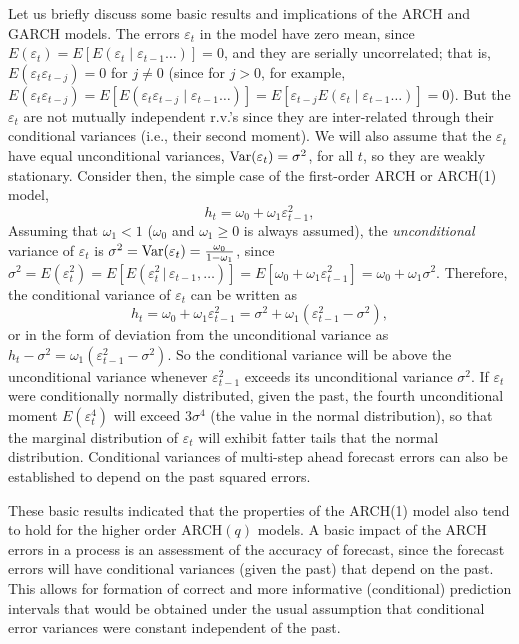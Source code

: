Let us briefly discuss some basic results and implications of the ARCH and GARCH models. The errors $\varepsilon_t$ in the model have zero mean, since $E(\varepsilon_t) = E[E(\varepsilon_t \;|\; \varepsilon_{t-1} \ldots)] = 0$, and they are serially uncorrelated; that is, $E(\varepsilon_t \varepsilon_{t-j}) = 0$ for $j \not= 0$ (since for $j > 0$, for example, $E(\varepsilon_t \varepsilon_{t-j}) = E[E(\varepsilon_t \varepsilon_{t-j} \;|\; \varepsilon_{t-1} \ldots)] = E[\varepsilon_{t-j} E(\varepsilon_t \;|\; \varepsilon_{t-1} \ldots)] = 0$). But the $\varepsilon_t$ are not mutually independent r.v.'s since they are inter-related through their conditional variances (i.e., their second moment). We will also assume that the $\varepsilon_t$ have equal unconditional variances, $\operatorname{Var}(\varepsilon_t) = \sigma^2$, for all $t$, so they are weakly stationary. Consider then, the simple case of the first-order ARCH or ARCH(1) model,
	\begin{equation} \label{eqn:2htE}
	h_t = \omega_0 + \omega_1 \varepsilon_{t-1}^2,
	\end{equation}
Assuming that $\omega_1 < 1$ ($\omega_0$ and $\omega_1 \geq 0$ is always assumed), the \emph{unconditional} variance of $\varepsilon_t$ is $\sigma^2= \operatorname{Var}(\varepsilon_t) = \frac{\omega_0}{1 - \omega_1}$, since $\sigma^2 = E(\varepsilon_t^2) = E[E(\varepsilon_t^2 \,|\, \varepsilon_{t-1}, \ldots)] = E[\omega_0 + \omega_1\varepsilon_{t-1}^2] = \omega_0 + \omega_1\sigma^2$. Therefore, the conditional variance of $\varepsilon_t$ can be written as
	\begin{equation} \label{eqn:2htw}
	h_t = \omega_0 + \omega_1 \varepsilon_{t-1}^2 = \sigma^2 + \omega_1 (\varepsilon_{t-1}^2 - \sigma^2),
	\end{equation}
or in the form of deviation from the unconditional variance as $h_t - \sigma^2= \omega_1 (\varepsilon_{t-1}^2 - \sigma^2)$. So the conditional variance will be above the unconditional variance whenever $\varepsilon_{t-1}^2$ exceeds its unconditional variance $\sigma^2$. If $\varepsilon_t$ were conditionally normally distributed, given the past, the fourth unconditional moment $E(\varepsilon_t^4)$ will exceed $3 \sigma^4$ (the value in the normal distribution), so that the marginal distribution of $\varepsilon_t$ will exhibit fatter tails that the normal distribution. Conditional variances of multi-step ahead forecast errors can also be established to depend on the past squared errors. 


These basic results indicated that the properties of the ARCH(1) model also tend to hold for the higher order ARCH$(q)$ models. A basic impact of the ARCH errors in a process is an assessment of the accuracy of forecast, since the forecast errors will have conditional variances (given the past) that depend on the past. This allows for formation of correct and more informative (conditional) prediction intervals that would be obtained under the usual assumption that conditional error variances were constant independent of the past.


